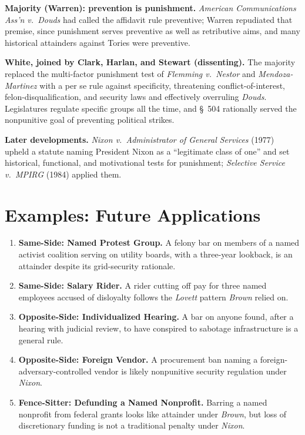 \documentclass[12pt]{article}
\begin{document}
\textbf{Majority (Warren): prevention is punishment.} \textit{American Communications Ass'n v.\ Douds} had called the affidavit rule preventive; Warren repudiated that premise, since punishment serves preventive as well as retributive aims, and many historical attainders against Tories were preventive.

\textbf{White, joined by Clark, Harlan, and Stewart (dissenting).} The majority replaced the multi-factor punishment test of \textit{Flemming v.\ Nestor} and \textit{Mendoza-Martinez} with a per se rule against specificity, threatening conflict-of-interest, felon-disqualification, and security laws and effectively overruling \textit{Douds}. Legislatures regulate specific groups all the time, and \S~504 rationally served the nonpunitive goal of preventing political strikes.

\textbf{Later developments.} \textit{Nixon v.\ Administrator of General Services} (1977) upheld a statute naming President Nixon as a ``legitimate class of one'' and set historical, functional, and motivational tests for punishment; \textit{Selective Service v.\ MPIRG} (1984) applied them.

\section{Examples: Future Applications}

\begin{enumerate}
\item \textbf{Same-Side: Named Protest Group.} A felony bar on members of a named activist coalition serving on utility boards, with a three-year lookback, is an attainder despite its grid-security rationale.
\item \textbf{Same-Side: Salary Rider.} A rider cutting off pay for three named employees accused of disloyalty follows the \textit{Lovett} pattern \textit{Brown} relied on.
\item \textbf{Opposite-Side: Individualized Hearing.} A bar on anyone found, after a hearing with judicial review, to have conspired to sabotage infrastructure is a general rule.
\item \textbf{Opposite-Side: Foreign Vendor.} A procurement ban naming a foreign-adversary-controlled vendor is likely nonpunitive security regulation under \textit{Nixon}.
\item \textbf{Fence-Sitter: Defunding a Named Nonprofit.} Barring a named nonprofit from federal grants looks like attainder under \textit{Brown}, but loss of discretionary funding is not a traditional penalty under \textit{Nixon}.
\end{enumerate}
\end{document}
